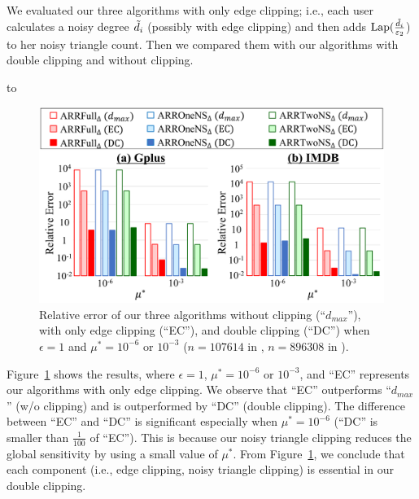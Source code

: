 {We evaluated our three algorithms with only
edge clipping; i.e., each user calculates a noisy degree $\tilde{d}_i$ (possibly with edge clipping) and then adds $\textrm{Lap}(\frac{\tilde{d}_i}{\varepsilon_2}$) to her noisy triangle count.
Then we compared them with our algorithms with double clipping and without clipping.

\begin{table}[t]
\caption{\#$4$-cycles $C_4$ in each graph dataset.}
\centering
\hbox to
\label{chap2-tab:resA_4cycles}
\end{table}

\begin{figure}[t]
  \centering
  \includegraphics[width=0.99\linewidth]{fig/res2_w_Lap_EC.pdf}
  \vspace{-4mm}
  \caption{Relative error of our three algorithms without clipping (``$d_{max}$''), with only edge clipping (``EC''), and double clipping (``DC'') when $\epsilon=1$ and $\mu^* = 10^{-6}$ or $10^{-3}$ ($n=107614$ in \GPlus{}, $n=896308$ in \IMDB{}).}
  \label{chap2-fig:res2_w_Lap_EC}
\end{figure}

Figure~\ref{chap2-fig:res2_w_Lap_EC} shows the results, where $\epsilon=1$, $\mu^* = 10^{-6}$ or $10^{-3}$, and ``EC'' represents our algorithms with only
edge clipping.
We observe that ``EC''
outperforms ``$d_{max}$'' (w/o clipping) and is outperformed by ``DC'' (double clipping).
The difference between ``EC'' and ``DC'' is significant especially when $\mu^* = 10^{-6}$ (``DC'' is smaller than $\frac{1}{100}$ of ``EC'').
This is because our noisy triangle clipping reduces the global sensitivity by using a small value of
$\mu^*$. 
From Figure~\ref{chap2-fig:res2_w_Lap_EC}, we conclude that each component (i.e.,
edge clipping, noisy triangle clipping) is essential in our double clipping.

}

